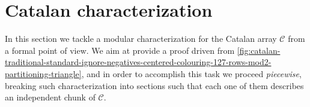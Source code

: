
\section{Catalan characterization}


In this section we tackle a modular characterization for the Catalan array
$\mathcal{C}$ from a formal point of view. We aim at provide a proof driven
from
\autoref{fig:catalan-traditional-standard-ignore-negatives-centered-colouring-127-rows-mod2-partitioning-triangle},
and in order to accomplish this task we proceed \emph{piecewise}, breaking such
characterization into sections such that each one of them describes an
independent chunk of $\mathcal{C}$.




